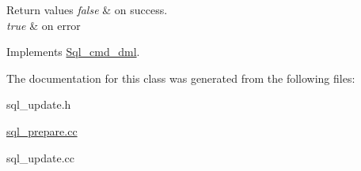 \begin{DoxyRetVals}{Return values}
{\em false} & on success. \\
\hline
{\em true} & on error \\
\hline
\end{DoxyRetVals}


Implements \mbox{\hyperlink{classSql__cmd__dml_af36dc69e855d0e48d0e79002576907a4}{Sql\+\_\+cmd\+\_\+dml}}.



The documentation for this class was generated from the following files\+:\begin{DoxyCompactItemize}
\item 
sql\+\_\+update.\+h\item 
\mbox{\hyperlink{sql__prepare_8cc}{sql\+\_\+prepare.\+cc}}\item 
sql\+\_\+update.\+cc\end{DoxyCompactItemize}
